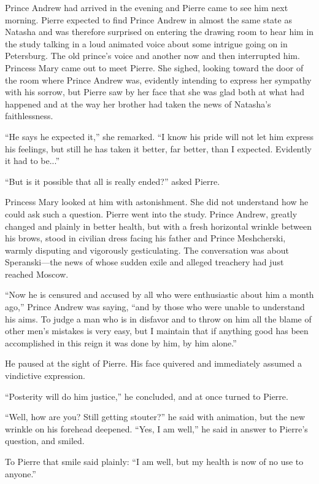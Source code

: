 Prince Andrew had arrived in the evening and Pierre came to see
him next morning. Pierre expected to find Prince Andrew in almost
the same state as Natasha and was therefore surprised on entering
the drawing room to hear him in the study talking in a loud
animated voice about some intrigue going on in Petersburg. The
old prince's voice and another now and then interrupted
him. Princess Mary came out to meet Pierre. She sighed, looking
toward the door of the room where Prince Andrew was, evidently
intending to express her sympathy with his sorrow, but Pierre saw
by her face that she was glad both at what had happened and at
the way her brother had taken the news of Natasha's
faithlessness.

``He says he expected it,'' she remarked. ``I know his pride will
not let him express his feelings, but still he has taken it
better, far better, than I expected. Evidently it had to be...''

``But is it possible that all is really ended?'' asked Pierre.

Princess Mary looked at him with astonishment. She did not
understand how he could ask such a question. Pierre went into the
study. Prince Andrew, greatly changed and plainly in better
health, but with a fresh horizontal wrinkle between his brows,
stood in civilian dress facing his father and Prince Meshcherski,
warmly disputing and vigorously gesticulating. The conversation
was about Speranski---the news of whose sudden exile and alleged
treachery had just reached Moscow.

``Now he is censured and accused by all who were enthusiastic
about him a month ago,'' Prince Andrew was saying, ``and by those
who were unable to understand his aims. To judge a man who is in
disfavor and to throw on him all the blame of other men's
mistakes is very easy, but I maintain that if anything good has
been accomplished in this reign it was done by him, by him
alone.''

He paused at the sight of Pierre. His face quivered and
immediately assumed a vindictive expression.

``Posterity will do him justice,'' he concluded, and at once
turned to Pierre.

``Well, how are you? Still getting stouter?'' he said with
animation, but the new wrinkle on his forehead deepened. ``Yes, I
am well,'' he said in answer to Pierre's question, and smiled.

To Pierre that smile said plainly: ``I am well, but my health is
now of no use to anyone.''

